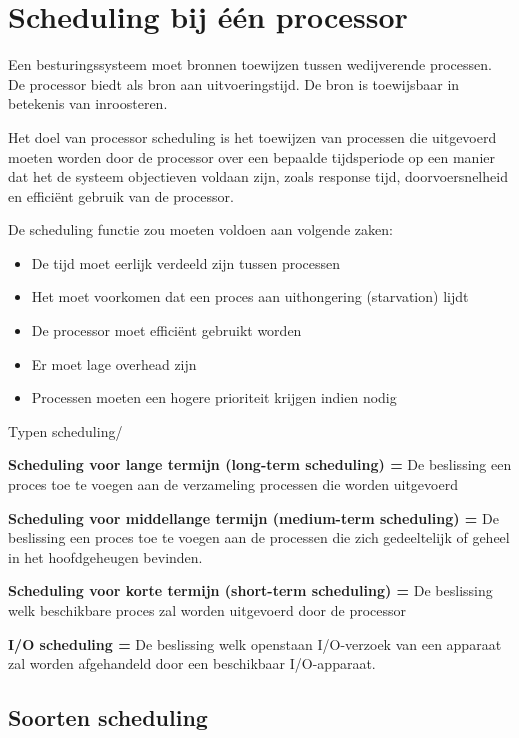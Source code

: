 \section{Scheduling bij één processor}

Een besturingssysteem moet bronnen toewijzen tussen wedijverende processen. De processor biedt als bron aan uitvoeringstijd. De bron is toewijsbaar in betekenis van inroosteren.

Het doel van processor scheduling is het toewijzen van processen die uitgevoerd moeten worden door de processor over een bepaalde tijdsperiode op een manier dat het de systeem objectieven voldaan zijn, zoals response tijd, doorvoersnelheid en efficiënt gebruik van de processor.

De scheduling functie zou moeten voldoen aan volgende zaken:

\begin{itemize}
\item De tijd moet eerlijk verdeeld zijn tussen processen
\item Het moet voorkomen dat een proces aan uithongering (starvation) lijdt
\item De processor moet efficiënt gebruikt worden
\item Er moet lage overhead zijn
\item Processen moeten een hogere prioriteit krijgen indien nodig 
\end{itemize}

Typen scheduling/

\textbf{Scheduling voor lange termijn (long-term scheduling) =}	De beslissing een proces toe te voegen aan de verzameling processen die worden uitgevoerd

\textbf{Scheduling voor middellange termijn (medium-term scheduling) =}	De beslissing een proces toe te voegen aan de processen die zich gedeeltelijk of geheel in het hoofdgeheugen bevinden.

\textbf{Scheduling voor korte termijn (short-term scheduling) =}	De beslissing welk beschikbare proces zal worden uitgevoerd door de processor

\textbf{I/O scheduling =}	De beslissing welk openstaan I/O-verzoek van een apparaat zal worden afgehandeld door een beschikbaar I/O-apparaat.

\subsection{Soorten scheduling}

